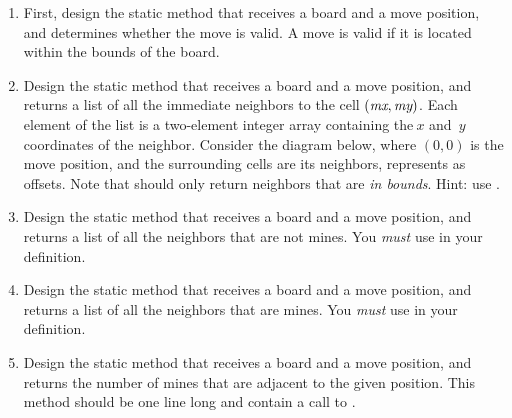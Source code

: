 \begin{enumerate}[label=(\alph*)]
    \item First, design the static  method that receives a board and a move position, and determines whether the move is valid. A move is valid if it is located within the bounds of the board.
    \item Design the static  method that receives a board and a move position, and returns a list of all the immediate neighbors to the cell $(\emph{mx}, \emph{my})$. 
    Each element of the list is a two-element integer array containing the$~x$ and~$y$ coordinates of the neighbor.
    Consider the diagram below, where $(0, 0)$ is the move position, and the surrounding cells are its neighbors, represents as offsets.
    Note that  should only return neighbors that are \emph{in bounds}. 
    Hint: use .

\begin{center}
\end{center}

    \item Design the static  method that receives a board and a move position, and returns a list of all the neighbors that are not mines. You \emph{must} use  in your definition.

    \item Design the static  method that receives a board and a move position, and returns a list of all the neighbors that are mines. You \emph{must} use  in your definition.

    \item Design the static  method that receives a board and a move position, and returns the number of mines that are adjacent to the given position. This method should be one line long and contain a call to .


\end{enumerate}
